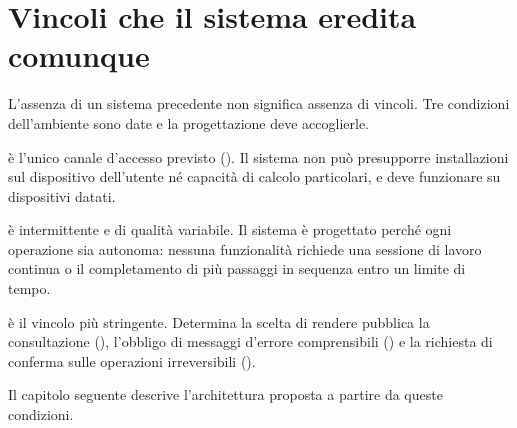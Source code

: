 \section{Vincoli che il sistema eredita comunque}

L'assenza di un sistema precedente non significa assenza di vincoli. Tre
condizioni dell'ambiente sono date e la progettazione deve accoglierle.

\begin{description}[leftmargin=1.4cm,style=nextline]
  \item[Il browser] è l'unico canale d'accesso previsto (). Il
    sistema non può presupporre installazioni sul dispositivo dell'utente né
    capacità di calcolo particolari, e deve funzionare su dispositivi datati.
  \item[La connessione] è intermittente e di qualità variabile. Il sistema è
    progettato perché ogni operazione sia autonoma: nessuna funzionalità
    richiede una sessione di lavoro continua o il completamento di più
    passaggi in sequenza entro un limite di tempo.
  \item[La competenza dell'utente] è il vincolo più stringente. Determina la
    scelta di rendere pubblica la consultazione (), l'obbligo di
    messaggi d'errore comprensibili () e la richiesta di
    conferma sulle operazioni irreversibili ().
\end{description}

Il capitolo seguente descrive l'architettura proposta a partire da queste
condizioni.
